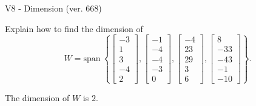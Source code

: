\begin{exercise}
  \begin{exerciseTitle}V8 - Dimension (ver. 668)\end{exerciseTitle}
  \begin{exerciseStatement}
    Explain how to find the dimension of 
\[W=\mathrm{span}\ \left\{\left[\begin{array}{r}
-3 \\
1 \\
3 \\
-4 \\
2
\end{array}\right] , \left[\begin{array}{r}
-1 \\
-4 \\
-4 \\
-3 \\
0
\end{array}\right] , \left[\begin{array}{r}
-4 \\
23 \\
29 \\
3 \\
6
\end{array}\right] , \left[\begin{array}{r}
8 \\
-33 \\
-43 \\
-1 \\
-10
\end{array}\right]\right\}.\]



  \end{exerciseStatement}
  \begin{exerciseAnswer}
   The dimension of \(W\) is  \(2\).
  


  \end{exerciseAnswer}
\end{exercise}